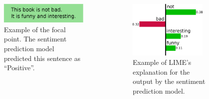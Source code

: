 \documentclass[aspectratio=169]{slide-ja}
\begin{document}
\begin{frame}{}
  \begin{columns}[]
    \begin{column}{0.35\textwidth}
      \vspace{4.2em}
      \begin{figure}
        \includegraphics[width=\textwidth]{example-instance}
        \vspace{0.8em}
        \caption{%
          Example of the focal point.
          The sentiment prediction model predicted this sentence as ``Positive''.
        }
      \end{figure}
    \end{column}
    \begin{column}{0.4\textwidth}
      \begin{figure}
        \includegraphics[width=0.9\textwidth]{example-lime}
        \caption{%
          Example of LIME's explanation for the output
          by the sentiment prediction model.
        }
      \end{figure}
    \end{column}
  \end{columns}
\end{frame}
\end{document}
